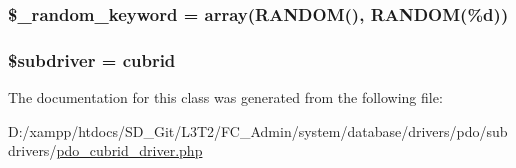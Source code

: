\subsubsection[{\$\+\_\+random\+\_\+keyword}]{\setlength{\rightskip}{0pt plus 5cm}\$\+\_\+random\+\_\+keyword = array(\textquotesingle{}R\+A\+N\+D\+O\+M()\textquotesingle{}, \textquotesingle{}R\+A\+N\+D\+O\+M(\%{\bf d})\textquotesingle{})\hspace{0.3cm}{\ttfamily [protected]}}\label{class_c_i___d_b__pdo__cubrid__driver_a10213aa6e05f6d924d3277bb1d2fea00}
\hypertarget{class_c_i___d_b__pdo__cubrid__driver_a1322ca756348b11d080cb7a4f590de15}{}
\subsubsection[{\$subdriver}]{\setlength{\rightskip}{0pt plus 5cm}\$subdriver = \textquotesingle{}cubrid\textquotesingle{}}\label{class_c_i___d_b__pdo__cubrid__driver_a1322ca756348b11d080cb7a4f590de15}


The documentation for this class was generated from the following file\+:\begin{DoxyCompactItemize}
\item 
D\+:/xampp/htdocs/\+S\+D\+\_\+\+Git/\+L3\+T2/\+F\+C\+\_\+\+Admin/system/database/drivers/pdo/subdrivers/\hyperlink{pdo__cubrid__driver_8php}{pdo\+\_\+cubrid\+\_\+driver.\+php}\end{DoxyCompactItemize}
